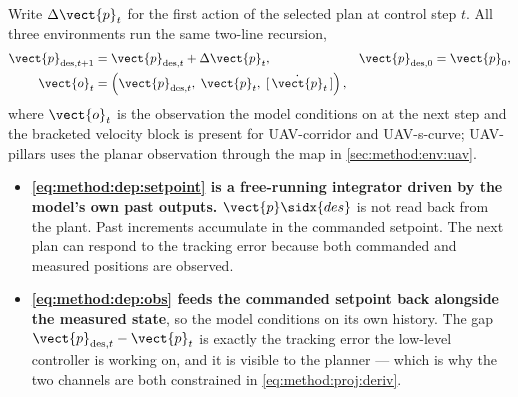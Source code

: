 Write $\Delta\vect{p}_{t}$ for the first action of the selected plan at control step $t$. All three
environments run the same two-line recursion,
\begin{align}
  \vect{p}_{\textrm{des},t+1} &= \vect{p}_{\textrm{des},t} + \Delta\vect{p}_{t},
    &&\vect{p}_{\textrm{des},0} = \vect{p}_{0},
    \label{eq:method:dep:setpoint}\\
  \vect{o}_{t} &= \left(\vect{p}_{\textrm{des},t},\;\vect{p}_{t},\;[\,\dot{\vect{p}}_{t}\,]\right),
    \label{eq:method:dep:obs}
\end{align}
where $\vect{o}_{t}$ is the observation the model conditions on at the next step and the bracketed
velocity block is present for UAV-corridor and UAV-s-curve; UAV-pillars uses the planar
observation through the map in \autoref{sec:method:env:uav}.

\begin{itemize}
  \item \textbf{\eqref{eq:method:dep:setpoint} is a free-running integrator driven by the model's own
    past outputs.} $\vect{p}\sidx{des}$ is not read back from the plant. Past increments accumulate in the commanded setpoint. The next plan can respond to the
    tracking error because both commanded and measured positions are observed.
  \item \textbf{\eqref{eq:method:dep:obs} feeds the commanded setpoint back alongside the measured
    state}, so the model conditions on its own history. The gap
    $\vect{p}_{\textrm{des},t} - \vect{p}_{t}$ is exactly the tracking error the low-level controller is
    working on, and it is visible to the planner --- which is why the two channels are both
    constrained in \eqref{eq:method:proj:deriv}.
\end{itemize}

